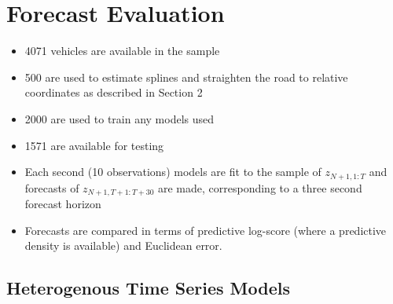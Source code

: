 \documentclass[12pt,a4paper]{article}\usepackage[]{graphicx}\usepackage[]{color}
\begin{document}
\section{Forecast Evaluation}

\begin{itemize}
\item 4071 vehicles are available in the sample
\item 500 are used to estimate splines and straighten the road to relative coordinates as described in Section 2
\item 2000 are used to train any models used
\item 1571 are available for testing
\item Each second (10 observations) models are fit to the sample of $z_{N+1, 1:T}$ and forecasts of $z_{N+1, T+1:T+30}$ are made, corresponding to a three second forecast horizon
\item Forecasts are compared in terms of predictive log-score (where a predictive density is available) and Euclidean error.
\end{itemize}

\subsection{Heterogenous Time Series Models}
\end{document}
